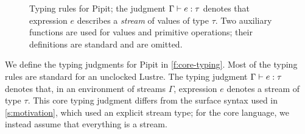 \documentclass[a4paper,UKenglish,cleveref, autoref, thm-restate,anonymous]{lipics-v2021}
\begin{document}
\begin{figure}
  \begin{mathpar}
\end{mathpar}


  \caption{Typing rules for Pipit; the judgment $\typing{\Gamma}{e}{\tau}$ denotes that expression $e$ describes a \emph{stream} of values of type $\tau$. Two auxiliary functions are used for values and primitive operations; their definitions are standard and are omitted.}\label{f:core-typing}
\end{figure} 
We define the typing judgments for Pipit in \autoref{f:core-typing}.
Most of the typing rules are standard for an unclocked Lustre.
The typing judgment $\typing{\Gamma}{e}{\tau}$ denotes that, in an environment of streams $\Gamma$, expression $e$ denotes a stream of type $\tau$.
This core typing judgment differs from the surface syntax used in \autoref{s:motivation}, which used an explicit stream type; for the core language, we instead assume that everything is a stream.
\end{document}
